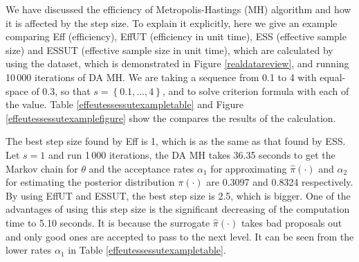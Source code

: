 We have discussed the efficiency of Metropolis-Hastings (MH) algorithm and how it is affected by the step size. To explain it explicitly, here we give an example comparing Eff (efficiency), EffUT (efficiency in unit time), ESS (effective sample size) and ESSUT (effective sample size in unit time), which are calculated by using the dataset, which is demonstrated in Figure \ref{realdatareview}, and running 10\,000 iterations of DA MH. We are taking a sequence from 0.1 to 4 with equal-space of 0.3, so that $s=\left\lbrace 0.1,\dots,4\right\rbrace$, and to solve criterion formula with each of the value. Table \ref{effeutessessutexampletable} and Figure \ref{effeutessessutexamplefigure} show the compares the results of the calculation. 

The best step size found by Eff is 1, which is as the same as that found by ESS. Let $s=1$ and run 1\,000 iterations, the DA MH takes 36.35 seconds to get the Markov chain for $\theta$ and the acceptance rates $\alpha_1$ for approximating $\hat{\pi}(\cdot)$ and $\alpha_2$ for estimating the posterior distribution $\pi(\cdot)$ are 0.3097 and 0.8324 respectively. By using EffUT and ESSUT, the best step size is 2.5, which is bigger. One of the advantages of using this step size is the significant decreasing of the computation time to 5.10 seconds. It is because the surrogate $\hat{\pi}(\cdot)$ takes bad proposals out and only good ones are accepted to pass to the next level. It can be seen from the lower rates $\alpha_1$ in Table \ref{effeutessessutexampletable}. 
